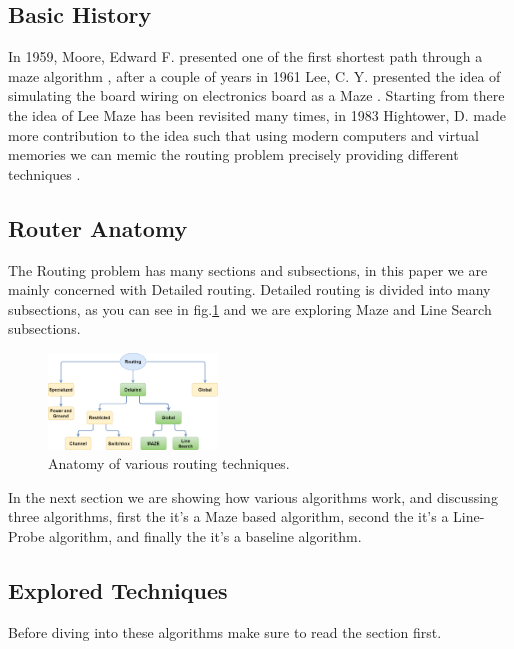 \subsection{Basic History}
    In 1959, Moore, Edward F. presented one of the first shortest path through a maze algorithm
    \cite{MooreRef}, after a couple of years in 1961 Lee, C. Y. presented the idea of simulating the 
    board wiring on electronics board as a Maze \cite{LeeRef}. Starting from there the idea of Lee Maze
    has been revisited many times, in 1983 Hightower, D. made more contribution to the idea such that
    using modern computers and virtual memories we can memic the routing problem precisely providing 
    different techniques \cite{HightowerRef}.
\subsection{Router Anatomy}
    The Routing problem has many sections and subsections, in this paper we are mainly concerned with
    Detailed routing. Detailed routing is divided into many subsections, as you can see in fig.\ref{fig:routing_anat} 
    and we are exploring Maze and Line Search subsections.

    \begin{figure}[H]
        \centering
        \includegraphics[width=0.4\textwidth]{figures/routing_anatomy.png}
        \caption{Anatomy of various routing techniques.}
        \label{fig:routing_anat}
    \end{figure}

    In the next section we are showing how various algorithms work, and discussing three 
    algorithms, first the  it's a Maze based algorithm, second the 
     it's a Line-Probe algorithm, and finally the  
    it's a baseline algorithm.

\subsection{Explored Techniques}
    Before diving into these algorithms make sure to read the  section first.
    \newline

